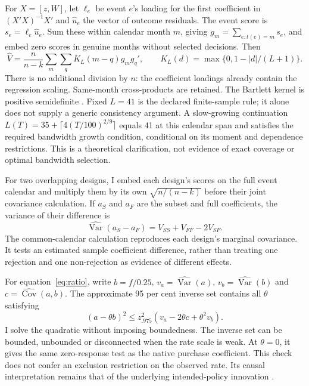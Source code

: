 \documentclass[11pt,a4paper]{article}
\begin{document}
For $X=[z,W]$, let $\ell_e$ be event $e$'s loading for the first coefficient in $(X'X)^{-1}X'$ and $\widehat u_e$ the vector of outcome residuals. The event score is $s_e=\ell_e\widehat u_e$. Sum these within calendar month $m$, giving $g_m=\sum_{e:t(e)=m}s_e$, and embed zero scores in genuine months without selected decisions. Then
\begin{equation}
 \widehat V=\frac{n}{n-k}\sum_m\sum_q K_L(m-q)g_mg_q',\qquad
 K_L(d)=\max\{0,1-|d|/(L+1)\}.\label{eq:hac}
\end{equation}
There is no additional division by $n$: the coefficient loadings already contain the regression scaling. Same-month cross-products are retained. The Bartlett kernel is positive semidefinite \citep{NeweyWest1987}. Fixed $L=41$ is the declared finite-sample rule; it alone does not supply a generic consistency argument. A slow-growing continuation $L(T)=35+\lceil4(T/100)^{2/9}\rceil$ equals 41 at this calendar span and satisfies the required bandwidth growth condition, conditional on its moment and dependence restrictions. This is a theoretical clarification, not evidence of exact coverage or optimal bandwidth selection.

For two overlapping designs, I embed each design's scores on the full event calendar and multiply them by its own $\sqrt{n/(n-k)}$ before their joint covariance calculation. If $a_S$ and $a_F$ are the subset and full coefficients, the variance of their difference is
\begin{equation}
 \widehat{\operatorname{Var}}(a_S-a_F)=V_{SS}+V_{FF}-2V_{SF}.\label{eq:contrast}
\end{equation}
The common-calendar calculation reproduces each design's marginal covariance. It tests an estimated sample coefficient difference, rather than treating one rejection and one non-rejection as evidence of different effects.

For equation~\eqref{eq:ratio}, write $b=f/0.25$, $v_a=\widehat{\operatorname{Var}}(a)$, $v_b=\widehat{\operatorname{Var}}(b)$ and $c=\widehat{\operatorname{Cov}}(a,b)$. The approximate 95 per cent inverse set contains all $\theta$ satisfying
\begin{equation}
 (a-\theta b)^2\leq z_{.975}^2(v_a-2\theta c+\theta^2v_b).\label{eq:ar}
\end{equation}
I solve the quadratic without imposing boundedness. The inverse set can be bounded, unbounded or disconnected when the rate scale is weak. At $\theta=0$, it gives the same zero-response test as the native purchase coefficient. This check does not confer an exclusion restriction on the observed rate. Its causal interpretation remains that of the underlying intended-policy innovation \citep{StockWatson2018}.
\end{document}
